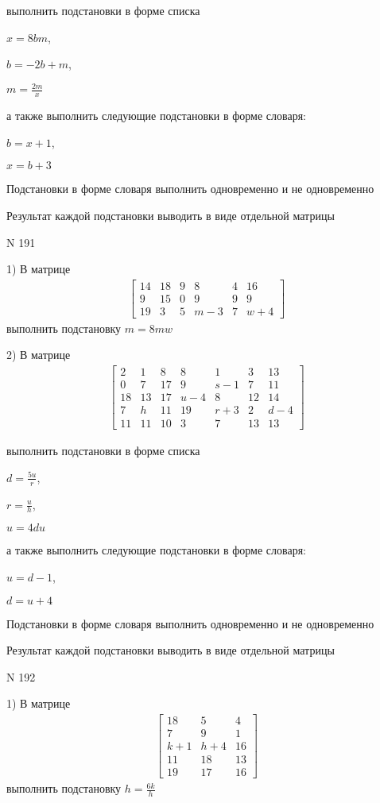 \documentclass[11pt]{report}
\begin{document}
выполнить подстановки в форме списка

$x=8 b m$,

$b=- 2 b + m$,

$m=\frac{2 m}{x}$

а также выполнить следующие подстановки в форме словаря:

$b=x + 1$,

$x=b + 3$


    Подстановки в форме словаря выполнить одновременно и не одновременно


    Результат каждой подстановки выводить в виде отдельной матрицы

\newpage
N 191


    1) В матрице
\begin{align*}
\left[\begin{matrix}14 & 18 & 9 & 8 & 4 & 16\\9 & 15 & 0 & 9 & 9 & 9\\19 & 3 & 5 & m - 3 & 7 & w + 4\end{matrix}\right]
\end{align*}
выполнить подстановку $m=8 m w$


    2) В матрице
\begin{align*}
\left[\begin{matrix}2 & 1 & 8 & 8 & 1 & 3 & 13\\0 & 7 & 17 & 9 & s - 1 & 7 & 11\\18 & 13 & 17 & u - 4 & 8 & 12 & 14\\7 & h & 11 & 19 & r + 3 & 2 & d - 4\\11 & 11 & 10 & 3 & 7 & 13 & 13\end{matrix}\right]
\end{align*}

выполнить подстановки в форме списка

$d=\frac{5 u}{r}$,

$r=\frac{u}{h}$,

$u=4 d u$

а также выполнить следующие подстановки в форме словаря:

$u=d - 1$,

$d=u + 4$


    Подстановки в форме словаря выполнить одновременно и не одновременно


    Результат каждой подстановки выводить в виде отдельной матрицы

\newpage
N 192


    1) В матрице
\begin{align*}
\left[\begin{matrix}18 & 5 & 4\\7 & 9 & 1\\k + 1 & h + 4 & 16\\11 & 18 & 13\\19 & 17 & 16\end{matrix}\right]
\end{align*}
выполнить подстановку $h=\frac{6 k}{h}$
\end{document}
